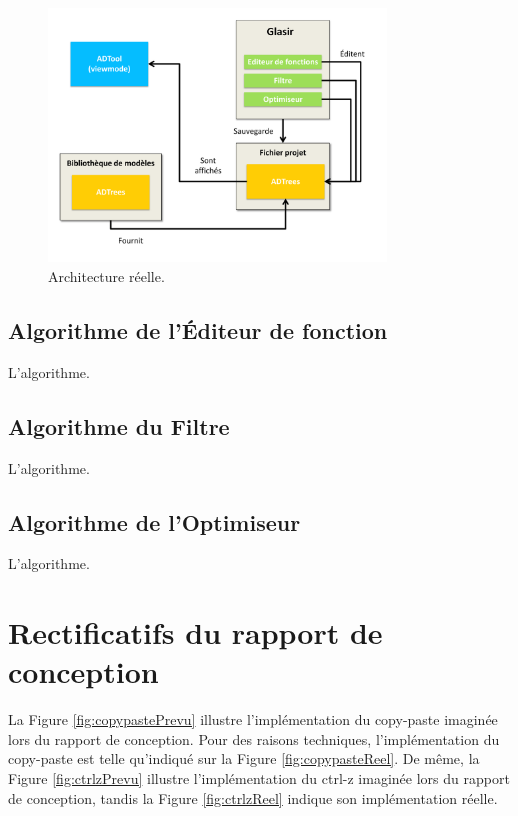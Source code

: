         
        \begin{figure}[H]
            \centering
                \includegraphics[width=0.8\textwidth]{figure/archiReelle.pdf}
            \caption{Architecture réelle.}
            \label{fig:archiReelle}
        \end{figure}
        
        
\subsection{Algorithme de l'Éditeur de fonction}
	L'algorithme.

\subsection{Algorithme du Filtre}
 	L'algorithme.

\subsection{Algorithme de l'Optimiseur}
	L'algorithme.
        

\newpage
\section{Rectificatifs du rapport de conception}
\label{sec:rectConc}

La {\sc Figure} \ref{fig:copypastePrevu} illustre l'implémentation du copy-paste imaginée lors du rapport de conception. Pour des raisons techniques, l'implémentation du copy-paste est telle qu'indiqué sur la {\sc Figure} \ref{fig:copypasteReel}. De même, la {\sc Figure} \ref{fig:ctrlzPrevu} illustre l'implémentation du ctrl-z imaginée lors du rapport de conception, tandis la {\sc Figure} \ref{fig:ctrlzReel} indique son implémentation réelle.

